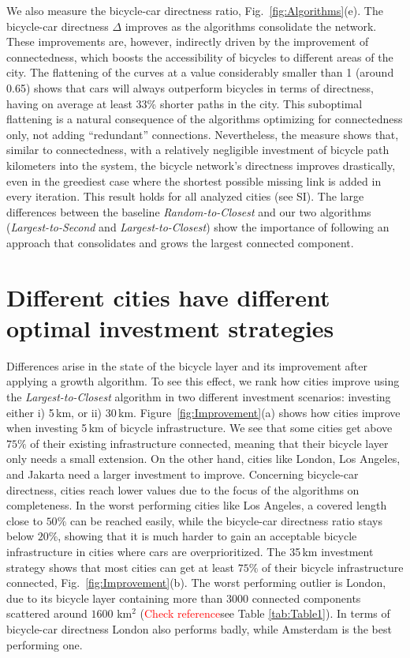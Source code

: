 We also measure the bicycle-car directness ratio, Fig.~\ref{fig:Algorithms}(e). The bicycle-car directness $\Delta$ improves as the algorithms consolidate the network. These improvements are, however, indirectly driven by the improvement of connectedness, which boosts the accessibility of bicycles to different areas of the city. The flattening of the curves at a value considerably smaller than 1 (around 0.65) shows that cars will always outperform bicycles in terms of directness, having on average at least 33\% shorter paths in the city. This suboptimal flattening is a natural consequence of the algorithms optimizing for connectedness only, not adding ``redundant'' connections. Nevertheless, the measure shows that, similar to connectedness, with a relatively negligible investment of bicycle path kilometers into the system, the bicycle network's directness improves drastically, even in the greediest case where the shortest possible missing link is added in every iteration. This result holds for all analyzed cities (see SI). The large differences between the baseline \emph{Random-to-Closest} and our two algorithms (\emph{Largest-to-Second} and \emph{Largest-to-Closest}) show the importance of following an approach that consolidates and grows the largest connected component.

\section{Different cities have different optimal investment strategies}
Differences arise in the state of the bicycle layer and its improvement after applying a growth algorithm. To see this effect, we rank how cities improve using the \textit{Largest-to-Closest} algorithm in two different investment scenarios: investing either i) 5\,km, or ii) 30\,km. Figure~\ref{fig:Improvement}(a) shows how cities improve when investing 5\,km of bicycle infrastructure. We see that some cities get above $75\%$ of their existing infrastructure connected, meaning that their bicycle layer only needs a small extension. On the other hand, cities like London, Los Angeles, and Jakarta need a larger investment to improve. Concerning bicycle-car directness, cities reach lower values due to the focus of the algorithms on completeness. In the worst performing cities like Los Angeles, a covered length close to $50\%$ can be reached easily, while the bicycle-car directness ratio stays below $20\%$, showing that it is much harder to gain an acceptable bicycle infrastructure in cities where cars are overprioritized. The 35\,km investment strategy shows that most cities can get at least $75\%$ of their bicycle infrastructure connected, Fig.~\ref{fig:Improvement}(b). The worst performing outlier is London, due to its bicycle layer containing more than 3000 connected components scattered around $1600$ km$^2$ (\textcolor{red}{Check reference}see Table \ref{tab:Table1}). In terms of bicycle-car directness London also performs badly, while Amsterdam is the best performing one.

